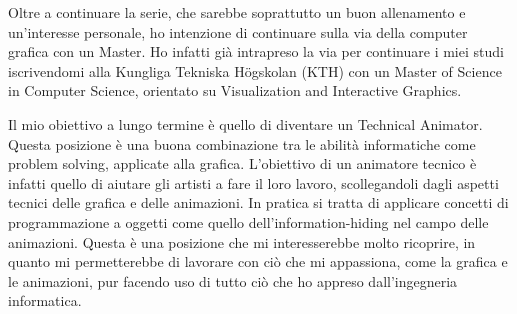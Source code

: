 Oltre a continuare la serie, che sarebbe soprattutto un buon allenamento e un'interesse personale, ho intenzione di continuare sulla via della computer grafica con un Master. Ho infatti già intrapreso la via per continuare i miei studi iscrivendomi alla Kungliga Tekniska Högskolan (KTH) con un Master of Science in Computer Science, orientato su Visualization and Interactive Graphics.

Il mio obiettivo a lungo termine è quello di diventare un Technical Animator. Questa posizione è una buona combinazione tra le abilità informatiche come problem solving, applicate alla grafica.
L'obiettivo di un animatore tecnico è infatti quello di aiutare gli artisti a fare il loro lavoro, scollegandoli dagli aspetti tecnici delle grafica e delle animazioni.
In pratica si tratta di applicare concetti di programmazione a oggetti come quello dell'information-hiding nel campo delle animazioni.
Questa è una posizione che mi interesserebbe molto ricoprire, in quanto mi permetterebbe di lavorare con ciò che mi appassiona, come la grafica e le animazioni, pur facendo uso di tutto ciò che ho appreso dall'ingegneria informatica.
